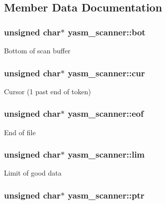 \subsection{Member Data Documentation}
\hypertarget{structyasm__scanner_ad9b2d3ca81aacaf1f7a8a9a49d6d226b}{
\subsubsection[{bot}]{\setlength{\rightskip}{0pt plus 5cm}unsigned char$\ast$ yasm\-\_\-scanner\-::bot}}\label{structyasm__scanner_ad9b2d3ca81aacaf1f7a8a9a49d6d226b}
Bottom of scan buffer \hypertarget{structyasm__scanner_a279716c6c031e925885b4f73743da881}{
\subsubsection[{cur}]{\setlength{\rightskip}{0pt plus 5cm}unsigned char$\ast$ yasm\-\_\-scanner\-::cur}}\label{structyasm__scanner_a279716c6c031e925885b4f73743da881}
Cursor (1 past end of token) \hypertarget{structyasm__scanner_a869a51d64f696b917340ac49c448152a}{
\subsubsection[{eof}]{\setlength{\rightskip}{0pt plus 5cm}unsigned char$\ast$ yasm\-\_\-scanner\-::eof}}\label{structyasm__scanner_a869a51d64f696b917340ac49c448152a}
End of file \hypertarget{structyasm__scanner_aac3201b372e7dceb325f9ab0e62f8e91}{
\subsubsection[{lim}]{\setlength{\rightskip}{0pt plus 5cm}unsigned char$\ast$ yasm\-\_\-scanner\-::lim}}\label{structyasm__scanner_aac3201b372e7dceb325f9ab0e62f8e91}
Limit of good data \hypertarget{structyasm__scanner_a6c6bbd227be15e70ad746f0388e6d6fe}{
\subsubsection[{ptr}]{\setlength{\rightskip}{0pt plus 5cm}unsigned char$\ast$ yasm\-\_\-scanner\-::ptr}}\label{structyasm__scanner_a6c6bbd227be15e70ad746f0388e6d6fe}

